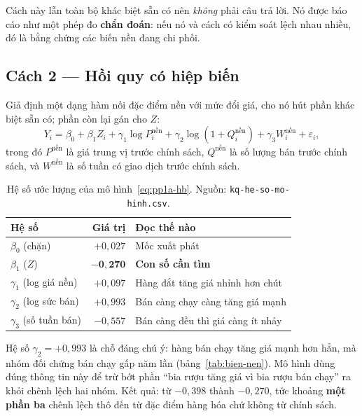 \documentclass[11pt]{article}
\begin{document}
Cách này lẫn toàn bộ khác biệt sẵn có nên \emph{không} phải câu trả lời. Nó được báo cáo như một
phép đo \textbf{chẩn đoán}: nếu nó và cách có kiểm soát lệch nhau nhiều, đó là bằng chứng các biến
nền đang chi phối.

\subsection{Cách 2 --- Hồi quy có hiệp biến}
\label{sec:cach-2}

Giả định một dạng hàm nối đặc điểm nền với mức đổi giá, cho nó hút phần khác biệt sẵn có; phần còn
lại gán cho $Z$:
\begin{equation}
  Y_i = \beta_0 + \beta_1 Z_i
      + \gamma_1 \log P_i^{\text{nền}}
      + \gamma_2 \log\!\left(1 + Q_i^{\text{nền}}\right)
      + \gamma_3 W_i^{\text{nền}}
      + \varepsilon_i,
  \label{eq:pp1a-hb}
\end{equation}
trong đó $P^{\text{nền}}$ là giá trung vị trước chính sách, $Q^{\text{nền}}$ là số lượng bán trước
chính sách, và $W^{\text{nền}}$ là số tuần có giao dịch trước chính sách.

\begin{table}[htbp]
  \centering
  \caption{Hệ số ước lượng của mô hình~\eqref{eq:pp1a-hb}. Nguồn:
  \texttt{kq-he-so-mo-hinh.csv}.}
  \label{tab:he-so-hb}
  \begin{tabular}{lrl}
    \toprule
    Hệ số & Giá trị & Đọc thế nào \\
    \midrule
    $\beta_0$ (chặn)      & $+0{,}027$ & Mốc xuất phát \\
    $\beta_1$ ($Z$)       & $\mathbf{-0{,}270}$ & \textbf{Con số cần tìm} \\
    $\gamma_1$ (log giá nền)   & $+0{,}097$ & Hàng đắt tăng giá nhỉnh hơn chút \\
    $\gamma_2$ (log sức bán)   & $+0{,}993$ & Bán càng chạy càng tăng giá mạnh \\
    $\gamma_3$ (số tuần bán)   & $-0{,}557$ & Bán càng đều thì giá càng ít nhảy \\
    \bottomrule
  \end{tabular}
\end{table}

Hệ số $\gamma_2 = +0{,}993$ là chỗ đáng chú ý: hàng bán chạy tăng giá mạnh hơn hẳn, mà nhóm đối
chứng bán chạy gấp năm lần (bảng~\ref{tab:bien-nen}). Mô hình dùng đúng thông tin này để trừ bớt
phần ``bia rượu tăng giá vì bia rượu bán chạy'' ra khỏi chênh lệch hai nhóm. Kết quả: từ
$-0{,}398$ thành $-0{,}270$, tức khoảng \textbf{một phần ba} chênh lệch thô đến từ đặc điểm hàng
hóa chứ không từ chính sách.
\end{document}
